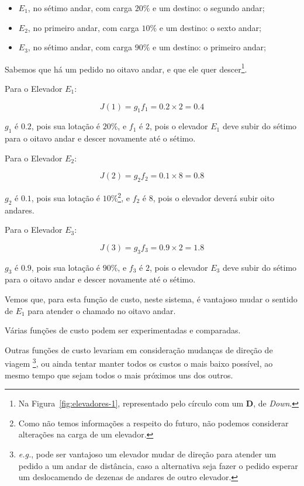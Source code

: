 \begin{itemize}
\item \textbf{$E_{1}$}, no sétimo andar, com carga $20\%$ e um destino: o segundo andar;
\item \textbf{$E_{2}$}, no primeiro andar, com carga $10\%$ e um destino: o sexto andar;
\item \textbf{$E_{3}$}, no sétimo andar, com carga $90\%$ e um destino: o primeiro andar;
\end{itemize}

Sabemos que há um pedido no oitavo andar, e que ele quer descer\footnote{Na
  Figura~\ref{fig:elevadores-1}, representado pelo círculo com um \textbf{D}, de
\textit{Down}.}.

Para o Elevador $E_{1}$:

\[J(1) = g_{1}f_{1} = 0.2 \times 2 = 0.4\]

$g_{1}$ é $0.2$, pois sua lotação é $20\%$, e $f_{1}$ é $2$, pois o elevador
$E_{1}$ deve subir do sétimo para o oitavo andar e descer novamente até o sétimo.

Para o Elevador $E_{2}$:

\[J(2) = g_{2}f_{2} = 0.1 \times 8 = 0.8\]

$g_{2}$ é $0.1$, pois sua lotação é $10\%$\footnote{Como não temos informações a
respeito do futuro, não podemos considerar alterações na carga de um elevador.},
e $f_{2}$ é $8$, pois o elevador deverá subir oito andares.

Para o Elevador $E_{3}$:

\[J(3) = g_{3}f_{3} = 0.9 \times 2 = 1.8\]

$g_{3}$ é $0.9$, pois sua lotação é $90\%$, e $f_{3}$ é $2$, pois o elevador
$E_{3}$ deve subir do sétimo para o oitavo andar e descer novamente até o sétimo.

Vemos que, para esta função de custo, neste sistema, é vantajoso mudar o sentido
de $E_{1}$ para atender o chamado no oitavo andar.

Várias funções de custo podem ser experimentadas e comparadas.

Outras funções de custo levariam em consideração mudanças de direção de viagem
\footnote{\textit{e.g.}, pode ser vantajoso um elevador mudar de direção para atender um
pedido a um andar de distância, caso a alternativa seja fazer o pedido esperar
um deslocamendo de dezenas de andares de outro elevador.}, ou ainda tentar
manter todos os custos o mais baixo possível, ao mesmo tempo que sejam todos o
mais próximos uns dos outros.

